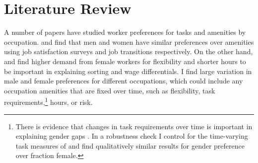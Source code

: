 \documentclass[11pt]{article}
\begin{document}
%
%
%
%
%

\section{Literature Review} \label{literature}

A number of papers have studied worker preferences for tasks and amenities by occupation.  and  find that men and women have similar preferences over amenities using job satisfaction surveys and job transitions respectively. On the other hand,  and  find higher demand from female workers for flexibility and shorter hours to be important in explaining sorting and wage differentials. I find large variation in male and female preferences for different occupations, which could include any occupation amenities that are fixed over time, such as flexibility, task requirements,\footnote{There is evidence that changes in task requirements over time is important in explaining gender gaps \cite{Black2010, atalay2017}. In a robustness check I control for the time-varying task measures of  and find qualitatively similar results for gender preference over fraction female.} hours, or risk.
\end{document}
